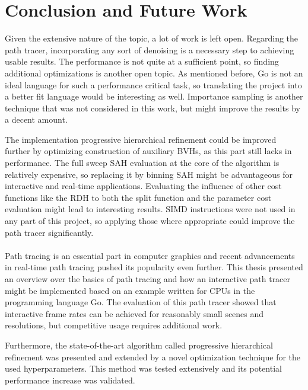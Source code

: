 \section{Conclusion and Future Work}
\label{conclusion}
Given the extensive nature of the topic, a lot of work is left open. Regarding the path tracer, incorporating any sort of denoising is a necessary step to achieving usable results. The performance is not quite at a sufficient point, so finding additional optimizations is another open topic. As mentioned before, Go is not an ideal language for such a performance critical task, so translating the project into a better fit language would be interesting as well. Importance sampling is another technique that was not considered in this work, but might improve the results by a decent amount. 

The implementation progressive hierarchical refinement could be improved further by optimizing construction of auxiliary BVHs, as this part still lacks in performance. The full sweep SAH evaluation at the core of the algorithm is relatively expensive, so replacing it by binning SAH might be advantageous for interactive and real-time applications. Evaluating the influence of other cost functions like the RDH to both the split function and the parameter cost evaluation might lead to interesting results. SIMD instructions were not used in any part of this project, so applying those where appropriate could improve the path tracer significantly.
\\\\
Path tracing is an essential part in computer graphics and recent advancements in real-time path tracing pushed its popularity even further. This thesis presented an overview over the basics of path tracing and how an interactive path tracer might be implemented based on an example written for CPUs in the programming language Go. The evaluation of this path tracer showed that interactive frame rates can be achieved for reasonably small scenes and resolutions, but competitive usage requires additional work. 

Furthermore, the state-of-the-art algorithm called progressive hierarchical refinement was presented and extended by a novel optimization technique for the used hyperparameters. This method was tested extensively and its potential performance increase was validated.
\cleardoublepage